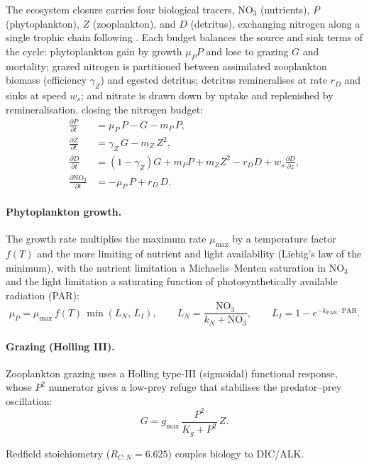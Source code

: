 \documentclass[11pt,twoside]{report}
\newcommand{\pp}{\partial}
\begin{document}
The ecosystem closure carries four biological tracers, NO$_3$ (nutrients),
$P$ (phytoplankton), $Z$ (zooplankton), and $D$ (detritus), exchanging
nitrogen along a single trophic chain following \citet{Fasham1990}.  Each
budget balances the source and sink terms of the cycle: phytoplankton gain
by growth $\mu_P P$ and lose to grazing $G$ and mortality; grazed nitrogen
is partitioned between assimilated zooplankton biomass (efficiency
$\gamma_Z$) and egested detritus; detritus remineralises at rate $r_D$ and
sinks at speed $w_s$; and nitrate is drawn down by uptake and replenished
by remineralisation, closing the nitrogen budget:
\begin{align}
  \frac{\pp P}{\pp t} &= \mu_P\,P - G - m_P\,P, \\
  \frac{\pp Z}{\pp t} &= \gamma_Z\,G - m_Z\,Z^2, \\
  \frac{\pp D}{\pp t} &= (1-\gamma_Z)G + m_P P + m_Z Z^2
  - r_D D + w_s\frac{\pp D}{\pp z}, \\
  \frac{\pp\mathrm{NO}_3}{\pp t} &= -\mu_P\,P + r_D\,D.
\end{align}

\paragraph{Phytoplankton growth.}
The growth rate multiplies the maximum rate $\mu_{\max}$ by a temperature
factor $f(T)$ and the more limiting of nutrient and light availability
(Liebig's law of the minimum), with the nutrient limitation a
Michaelis--Menten saturation in NO$_3$ and the light limitation a
saturating function of photosynthetically available radiation (PAR):
\begin{equation}
  \mu_P = \mu_{\max}\,f(T)\,\min(L_N,\,L_I),
  \qquad L_N = \frac{\mathrm{NO}_3}{k_N+\mathrm{NO}_3},
  \qquad L_I = 1-e^{-k_{\mathrm{PAR}}\cdot\mathrm{PAR}}.
\end{equation}

\paragraph{Grazing (Holling III).}
Zooplankton grazing uses a Holling type-III (sigmoidal) functional
response, whose $P^2$ numerator gives a low-prey refuge that stabilises the
predator--prey oscillation:
\begin{equation}
  G = g_{\max}\,\frac{P^2}{K_g+P^2}\,Z.
\end{equation}

Redfield stoichiometry ($R_{C:N}=6.625$) couples biology to DIC/ALK.
\end{document}
